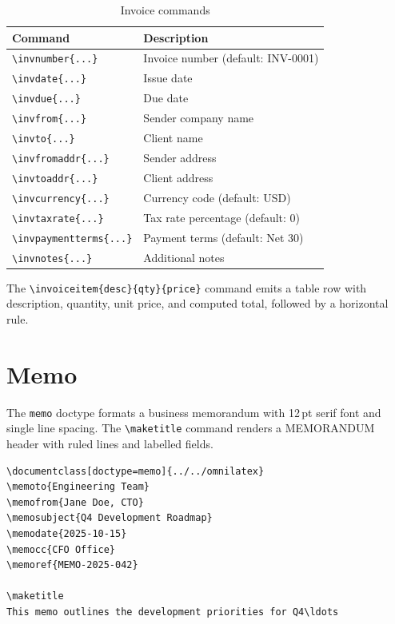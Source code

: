 \begin{table}[htbp]
    \centering
    \caption{Invoice commands}
    \label{tab:invoice-commands}
    \begin{tabular}{@{} l p{7.5cm} @{}}
        \toprule
        \textbf{Command} & \textbf{Description} \\
        \midrule
        \texttt{\textbackslash invnumber\{...\}}       & Invoice number (default: INV-0001) \\
        \texttt{\textbackslash invdate\{...\}}         & Issue date \\
        \texttt{\textbackslash invdue\{...\}}          & Due date \\
        \texttt{\textbackslash invfrom\{...\}}         & Sender company name \\
        \texttt{\textbackslash invto\{...\}}           & Client name \\
        \texttt{\textbackslash invfromaddr\{...\}}     & Sender address \\
        \texttt{\textbackslash invtoaddr\{...\}}       & Client address \\
        \texttt{\textbackslash invcurrency\{...\}}     & Currency code (default: USD) \\
        \texttt{\textbackslash invtaxrate\{...\}}      & Tax rate percentage (default: 0) \\
        \texttt{\textbackslash invpaymentterms\{...\}} & Payment terms (default: Net 30) \\
        \texttt{\textbackslash invnotes\{...\}}        & Additional notes \\
        \bottomrule
    \end{tabular}
\end{table}

The \texttt{\textbackslash invoiceitem\{desc\}\{qty\}\{price\}} command
emits a table row with description, quantity, unit price, and computed
total, followed by a horizontal rule.

\section{Memo}
\label{sec:memo}

The \texttt{memo} doctype formats a business memorandum with 12\,pt serif
font and single line spacing.  The \texttt{\textbackslash maketitle}
command renders a MEMORANDUM header with ruled lines and labelled fields.

\begin{verbatim}
\documentclass[doctype=memo]{../../omnilatex}
\memoto{Engineering Team}
\memofrom{Jane Doe, CTO}
\memosubject{Q4 Development Roadmap}
\memodate{2025-10-15}
\memocc{CFO Office}
\memoref{MEMO-2025-042}

\maketitle
This memo outlines the development priorities for Q4\ldots

\end{verbatim}

